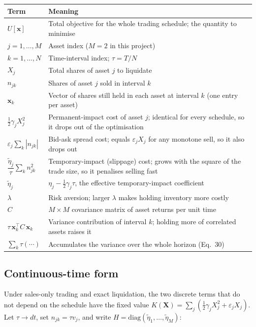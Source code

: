 \documentclass[11pt,a4paper]{article}
\begin{document}
    \begin{center}
    \begin{tabular}{@{}L{3.8cm}L{10cm}@{}}
    \toprule
    \textbf{Term} & \textbf{Meaning} \\
    \midrule
    $U[\mathbf{x}]$ & Total objective for the whole trading schedule; the quantity to minimise \\
    $j = 1,\dots,M$ & Asset index ($M=2$ in this project) \\
    $k = 1,\dots,N$ & Time-interval index; $\tau = T/N$ \\
    $X_j$ & Total shares of asset $j$ to liquidate \\
    $n_{jk}$ & Shares of asset $j$ sold in interval $k$ \\
    $\mathbf{x}_k$ & Vector of shares still held in each asset at interval $k$ (one entry per asset) \\
    $\tfrac{1}{2}\gamma_j X_j^2$ & Permanent-impact cost of asset $j$; identical for every schedule, so it drops out of the optimisation \\
    $\varepsilon_j\sum_k |n_{jk}|$ & Bid-ask spread cost; equals $\varepsilon_j X_j$ for any monotone sell, so it also drops out \\
    $\dfrac{\tilde\eta_j}{\tau}\sum_k n_{jk}^2$ & Temporary-impact (slippage) cost; grows with the square of the trade size, so it penalises selling fast \\
    $\tilde\eta_j$ & $\eta_j - \tfrac12\gamma_j\tau$, the effective temporary-impact coefficient \\
    $\lambda$ & Risk aversion; larger $\lambda$ makes holding inventory more costly \\
    $C$ & $M\times M$ covariance matrix of asset returns per unit time \\
    $\tau\,\mathbf{x}_k^\top C\,\mathbf{x}_k$ & Variance contribution of interval $k$; holding more of correlated assets raises it \\
    $\sum_k \tau(\cdots)$ & Accumulates the variance over the whole horizon (Eq.~30) \\
    \bottomrule
    \end{tabular}
    \end{center}

    \subsection*{Continuous-time form}

    Under sales-only trading and exact liquidation, the two discrete terms that
    do not depend on the schedule have the fixed value
    $K(\mathbf X)=\sum_j(\tfrac12\gamma_jX_j^2+\varepsilon_jX_j)$. Let
    $\tau\to dt$, set $n_{jk}=\tau v_j$, and write
    $H=\mathrm{diag}(\tilde\eta_1,\dots,\tilde\eta_M)$:
\end{document}
